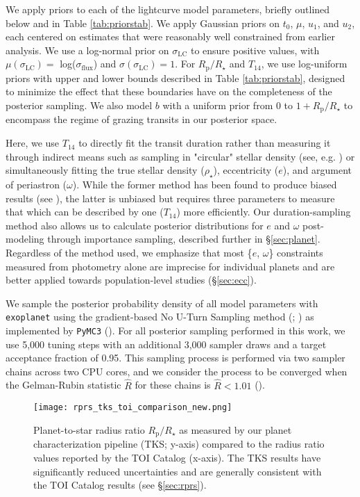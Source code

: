 \documentclass[twocolumn]{aastex63}
\begin{document}
We apply priors to each of the lightcurve model parameters, briefly outlined below and in Table \ref{tab:priorstab}. We apply Gaussian priors on $t_0$, $\mu$, $u_1$, and $u_2$, each centered on estimates that were reasonably well constrained from earlier analysis. We use a log-normal prior on $\sigma_\textrm{LC}$ to ensure positive values, with $\mu(\sigma_\textrm{LC}) =$ log($\sigma_\textrm{flux}$) and $\sigma(\sigma_\textrm{LC}) = 1$. For $R_\textrm{p}/R_\star$ and $T_{14}$, we use log-uniform priors with upper and lower bounds described in Table \ref{tab:priorstab}, designed to minimize the effect that these boundaries have on the completeness of the posterior sampling. We also model $b$ with a uniform prior from 0 to $1 + R_\textrm{p}/R_\star$ to encompass the regime of grazing transits in our posterior space.

Here, we use $T_{14}$ to directly fit the transit duration rather than measuring it through indirect means such as sampling in "circular" stellar density (see, e.g. \citealt{Dawson12}) or simultaneously fitting the true stellar density ($\rho_\star$), eccentricity ($e$), and argument of periastron ($\omega$). While the former method has been found to produce biased results (see \citealt{Gilbert22}), the latter is unbiased but requires three parameters to measure that which can be described by one ($T_{14}$) more efficiently. Our duration-sampling method also allows us to calculate posterior distributions for $e$ and $\omega$ post-modeling through importance sampling, described further in \S\ref{sec:planet}. Regardless of the method used, we emphasize that most \{$e$, $\omega$\} constraints measured from photometry alone are imprecise for individual planets and are better applied towards population-level studies (\S\ref{sec:ecc}). 

We sample the posterior probability density of all model parameters with \texttt{exoplanet} using the gradient-based No U-Turn Sampling method (\citealt{Hoffman11}; \citealt{Betancourt16}) as implemented by \texttt{PyMC3} (\citealt{pymc16}). For all posterior sampling performed in this work, we use 5,000 tuning steps with an additional 3,000 sampler draws and a target acceptance fraction of 0.95. This sampling process is performed via two sampler chains across two CPU cores, and we consider the process to be converged when the Gelman-Rubin statistic $\hat{R}$ for these chains is $\hat{R} < 1.01$ (\citealt{Gelman92}).

\begin{figure}[ht]
\centering
\texttt{[image: rprs\_tks\_toi\_comparison\_new.png]}
\caption{Planet-to-star radius ratio $R_\textrm{p}/R_\star$ as measured by our planet characterization pipeline (TKS; y-axis) compared to the radius ratio values reported by the TOI Catalog (x-axis). The TKS results have significantly reduced uncertainties and are generally consistent with the TOI Catalog results (see \S\ref{sec:rprs}).} 
\label{fig:rprs-comp}
\end{figure}
\end{document}
